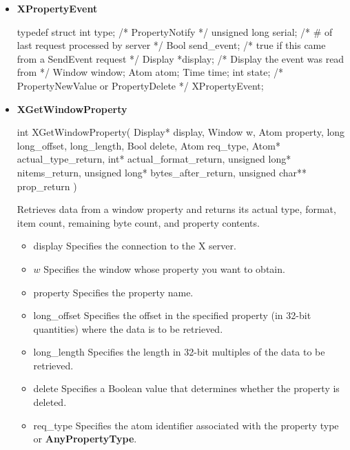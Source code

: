 \documentclass{report}
\begin{document}
\begin{itemize}
        \item \textbf{XPropertyEvent}
            \bigbreak \noindent 
            \begin{cppcode}
                typedef struct {
                    int type;               /* PropertyNotify */
                    unsigned long serial;   /* # of last request processed by server */
                    Bool send_event;        /* true if this came from a SendEvent request */
                    Display *display;       /* Display the event was read from */
                    Window window;
                    Atom atom;
                    Time time;
                    int state;              /* PropertyNewValue or PropertyDelete */
                } XPropertyEvent;
            \end{cppcode}
        \item \textbf{XGetWindowProperty}
            \bigbreak \noindent 
            \begin{cppcode}
            int XGetWindowProperty(
                Display* display,
                Window w,
                Atom property,
                long long_offset, long_length,
                Bool delete,
                Atom req_type,
                Atom* actual_type_return,
                int* actual_format_return,
                unsigned long* nitems_return,
                unsigned long* bytes_after_return,
                unsigned char** prop_return
            )
            \end{cppcode}
            \bigbreak \noindent
            Retrieves data from a window property and returns its actual type, format, item count, remaining byte count, and property contents.
            \begin{itemize}
                \item display Specifies the connection to the X server.
                \item $w$ Specifies the window whose property you want to obtain.
                \item property Specifies the property name.
                \item long\_offset Specifies the offset in the specified property (in 32-bit quantities) where the data is to be retrieved.
                \item long\_length Specifies the length in 32-bit multiples of the data to be retrieved.
                \item delete Specifies a Boolean value that determines whether the property is deleted.
                \item req\_type Specifies the atom identifier associated with the property type or \textbf{AnyPropertyType}.

\end{itemize}
\end{itemize}
\end{document}
